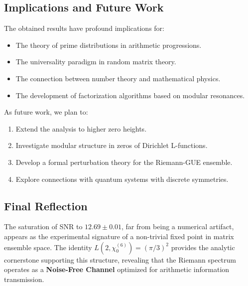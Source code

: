 \documentclass[12pt, a4paper]{article}
\theoremstyle{plain}
\theoremstyle{definition}
\theoremstyle{remark}
\begin{document}
\subsection{Implications and Future Work}
\label{subsec:implicaciones}

The obtained results have profound implications for:
\begin{itemize}
    \item The theory of prime distributions in arithmetic progressions.
    \item The universality paradigm in random matrix theory.
    \item The connection between number theory and mathematical physics.
    \item The development of factorization algorithms based on modular resonances.
\end{itemize}

As future work, we plan to:
\begin{enumerate}
    \item Extend the analysis to higher zero heights.
    \item Investigate modular structure in zeros of Dirichlet L-functions.
    \item Develop a formal perturbation theory for the Riemann-GUE ensemble.
    \item Explore connections with quantum systems with discrete symmetries.
\end{enumerate}

\subsection{Final Reflection}
\label{subsec:reflexion}

The saturation of SNR to $12.69 \pm 0.01$, far from being a numerical artifact, appears as the experimental signature of a non-trivial fixed point in matrix ensemble space. The identity $L(2,\chi_0^{(6)}) = (\pi/3)^2$ provides the analytic cornerstone supporting this structure, revealing that the Riemann spectrum operates as a \textbf{Noise-Free Channel} optimized for arithmetic information transmission.

\appendix

\end{document}
